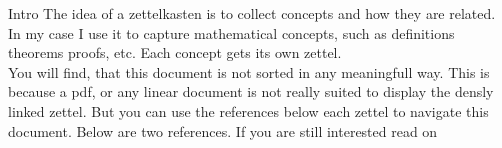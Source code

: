 \documentclass[class=article, crop=false]{standalone}
\begin{document}
\begin{zettel}{Intro}
    The idea of a zettelkasten is to collect concepts and how they are related. In my case I use it to capture mathematical concepts, such as definitions theorems proofs, etc. Each concept gets its own zettel.\\

You will find, that this document is not sorted in any meaningfull way. This is because a pdf, or any linear document is not really suited to display the densly linked zettel. But you can use the references below each zettel to navigate this document.
Below are two references. If you are still interested read on

\end{zettel}
\end{document}
